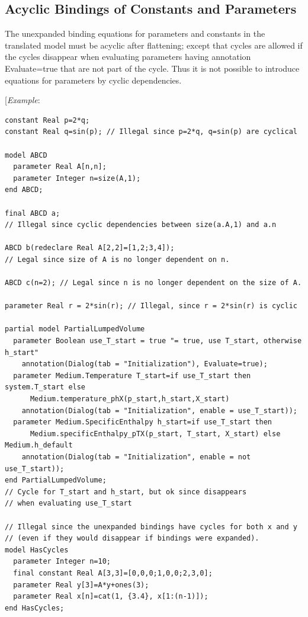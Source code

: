 \documentclass[10pt,a4paper]{report}
\def\doublelabel#1{\label{#1}\hypertarget{#1}{}}
\begin{document}
\subsection{Acyclic Bindings of Constants and Parameters}\doublelabel{acyclic-bindings-of-constants-and-parameters}

The unexpanded binding equations for parameters and constants in the
translated model must be acyclic after flattening; except that cycles
are allowed if the cycles disappear when evaluating parameters having
annotation Evaluate=true that are not part of the cycle. Thus it is not
possible to introduce equations for parameters by cyclic dependencies.

{[}\emph{Example}:
\begin{lstlisting}[language=modelica]
constant Real p=2*q;
constant Real q=sin(p); // Illegal since p=2*q, q=sin(p) are cyclical

model ABCD
  parameter Real A[n,n];
  parameter Integer n=size(A,1);
end ABCD;

final ABCD a;
// Illegal since cyclic dependencies between size(a.A,1) and a.n

ABCD b(redeclare Real A[2,2]=[1,2;3,4]);
// Legal since size of A is no longer dependent on n.

ABCD c(n=2); // Legal since n is no longer dependent on the size of A.

parameter Real r = 2*sin(r); // Illegal, since r = 2*sin(r) is cyclic

partial model PartialLumpedVolume
  parameter Boolean use_T_start = true "= true, use T_start, otherwise h_start"
    annotation(Dialog(tab = "Initialization"), Evaluate=true);
  parameter Medium.Temperature T_start=if use_T_start then system.T_start else
      Medium.temperature_phX(p_start,h_start,X_start)
    annotation(Dialog(tab = "Initialization", enable = use_T_start));
  parameter Medium.SpecificEnthalpy h_start=if use_T_start then
      Medium.specificEnthalpy_pTX(p_start, T_start, X_start) else Medium.h_default
    annotation(Dialog(tab = "Initialization", enable = not use_T_start));
end PartialLumpedVolume;
// Cycle for T_start and h_start, but ok since disappears
// when evaluating use_T_start

// Illegal since the unexpanded bindings have cycles for both x and y
// (even if they would disappear if bindings were expanded).
model HasCycles
  parameter Integer n=10;
  final constant Real A[3,3]=[0,0,0;1,0,0;2,3,0];
  parameter Real y[3]=A*y+ones(3);
  parameter Real x[n]=cat(1, {3.4}, x[1:(n-1)]);
end HasCycles;
\end{lstlisting}
\end{document}
